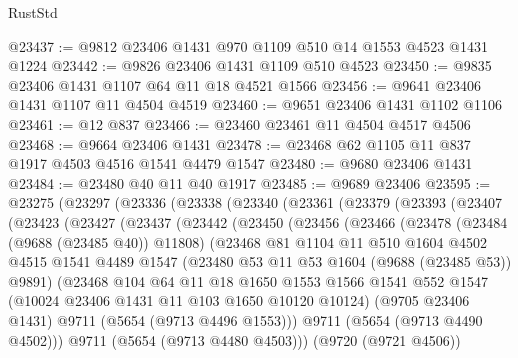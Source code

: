 \begin{lexlean}{RustStd}
\begin{coremodule}
@23437 := @9812 @23406 @1431 @970 @1109 @510 @14 @1553 @4523 @1431 @1224
@23442 := @9826 @23406 @1431 @1109 @510 @4523
@23450 := @9835 @23406 @1431 @1107 @64 @11 @18 @4521 @1566
@23456 := @9641 @23406 @1431 @1107 @11 @4504 @4519
@23460 := @9651 @23406 @1431 @1102 @1106
@23461 := @12 @837
@23466 := @23460 @23461 @11 @4504 @4517 @4506
@23468 := @9664 @23406 @1431
@23478 := @23468 @62 @1105 @11 @837 @1917 @4503 @4516 @1541 @4479 @1547
@23480 := @9680 @23406 @1431
@23484 := @23480 @40 @11 @40 @1917
@23485 := @9689 @23406
@23595 := @23275
    (@23297
      (@23336
        (@23338
          (@23340
            (@23361
              (@23379
                (@23393
                  (@23407
                    (@23423
                      (@23427
                        (@23437
                          (@23442
                            (@23450
                              (@23456
                                (@23466
                                  (@23478
                                    (@23484 (@9688 (@23485 @40)) @11808)
                                    (@23468
                                      @81
                                      @1104
                                      @11
                                      @510
                                      @1604
                                      @4502
                                      @4515
                                      @1541
                                      @4489
                                      @1547
                                      (@23480 @53 @11 @53 @1604 (@9688 (@23485 @53)) @9891)
                                      (@23468
                                        @104
                                        @64
                                        @11
                                        @18
                                        @1650
                                        @1553
                                        @1566
                                        @1541
                                        @552
                                        @1547
                                        (@10024 @23406 @1431 @11 @103 @1650 @10120 @10124)
                                        (@9705 @23406 @1431)
                                        @9711
                                        (@5654 (@9713 @4496 @1553)))
                                      @9711
                                      (@5654 (@9713 @4490 @4502)))
                                    @9711
                                    (@5654 (@9713 @4480 @4503)))
                                  (@9720 (@9721 @4506))

\end{coremodule}
\end{lexlean}
